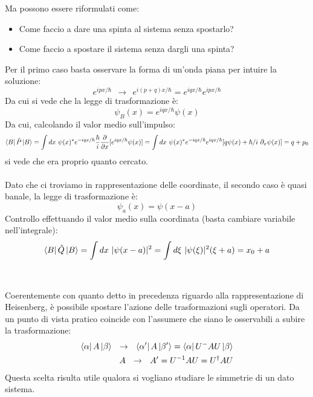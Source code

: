 \documentclass[twoside]{article}
\begin{document}
Ma possono essere riformulati come:
\begin{itemize}
    \item Come faccio a dare una spinta al sistema senza spostarlo?
    \item Come faccio a spostare il sistema senza dargli una spinta?
\end{itemize}

Per il primo caso basta osservare la forma di un'onda piana per intuire la soluzione:
\begin{equation}
    e^{ipx/\hbar} \ \ \rightarrow \ \ e^{i(p+q)x/\hbar}=e^{iqx/\hbar}e^{ipx/\hbar}
\end{equation}
Da cui si vede che la legge di trasformazione è:
\begin{equation}
    \psi_B(x)=e^{iqx/\hbar}\psi(x)
\end{equation}
Da cui, calcolando il valor medio sull'impulso:
\begin{equation}
    \bra{B}\hat{P}\ket{B}=\int dx \ \psi(x)^* e^{-iqx/\hbar} \frac{\hbar}{i}\frac{\partial}{\partial x}[e^{iqx/\hbar}\psi(x)]=\int dx \ \psi(x)^* e^{-iqx/\hbar}e^{iqx/\hbar}[q\psi(x)+\hbar/i \ \partial_x \psi(x)]=q + p_0
\end{equation}
si vede che era proprio quanto cercato.
\\
\\
Dato che ci troviamo in rappresentazione delle coordinate, il secondo caso è quasi banale, la legge di trasformazione è:
\begin{equation}
    \psi_a (x)=\psi (x-a)
\end{equation}
Controllo effettuando il valor medio sulla coordinata (basta cambiare variabile nell'integrale):
\begin{equation}
    \bra{B}\hat{Q}\ket{B}=\int dx \ |\psi(x-a)|^2= \int d\xi \ |\psi(\xi)|^2 (\xi+a)=x_0 +a
\end{equation}
\\
\\
Coerentemente con quanto detto in precedenza riguardo alla rappresentazione di Heisenberg, è possibile spostare l'azione delle trasformazioni sugli operatori. Da un punto di vista pratico coincide con l'assumere che siano le osservabili a subire la trasformazione:
\begin{equation} \begin{split}
    \bra{\alpha}A\ket{\beta} \ \ \rightarrow \ \ \bra{\alpha'}A\ket{\beta'}=\bra{\alpha}U^{-}
AU\ket{\beta} \\
A \ \ \rightarrow \ \ A'=U^{-1}AU=U^{\dagger}AU
\end{split} \end{equation}
Questa scelta risulta utile qualora si vogliano studiare le simmetrie di un dato sistema.
\end{document}

